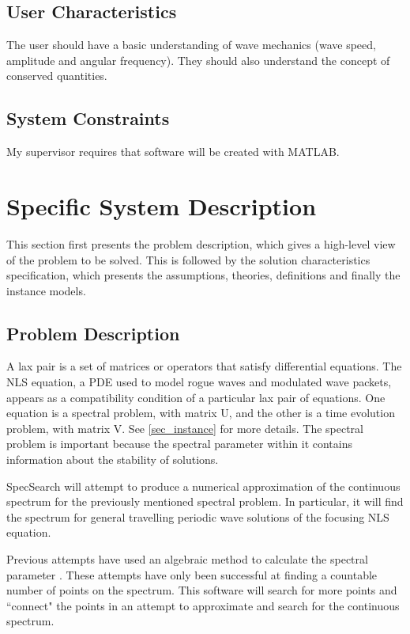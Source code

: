 \documentclass[12pt]{article}
\begin{document}
\subsection{User Characteristics} \label{SecUserCharacteristics}

The user should have a basic understanding of wave mechanics (wave 
speed, 
amplitude and angular frequency). They should also understand the concept of 
conserved quantities. 

\subsection{System Constraints}

My supervisor requires that software will be created with MATLAB.


\section{Specific System Description}

This section first presents the problem description, which gives a high-level
view of the problem to be solved.  This is followed by the solution 
characteristics specification, which presents the assumptions, theories, 
definitions and finally the instance models. 

\subsection{Problem Description} \label{Sec_pd}
A lax pair is a set of matrices or operators that satisfy differential 
equations. The NLS equation, a PDE used to model rogue waves and modulated wave 
packets, appears as a compatibility condition of a particular lax pair of 
equations. One equation is a spectral problem, with matrix U, and the other is 
a time evolution problem, with matrix V. See \ref{sec_instance} for more 
details. The spectral problem is important because the spectral parameter 
within it contains information about the stability of solutions.

SpecSearch will attempt to produce a numerical approximation of the continuous 
spectrum for the previously mentioned spectral problem. In particular, 
it will find the spectrum for general travelling periodic wave solutions of the 
focusing
NLS equation.  

Previous attempts have used an algebraic method to calculate the spectral 
parameter \cite{SegaletAl}. These attempts have only been 
successful at finding a countable number of points on the spectrum. This 
software will 
search for more points and ``connect" the points in an attempt to approximate 
and search for the continuous spectrum.  
\end{document}
